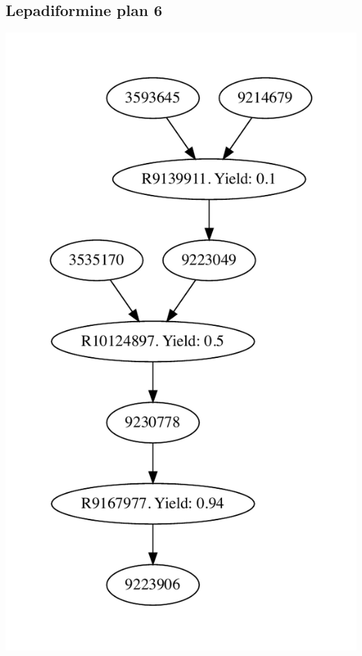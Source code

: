 \documentclass[a4paper,10pt,titlepage]{paper}
\begin{document}
\subsection{Lepadiformine plan 6}
\centering
\includegraphics[scale=0.4]{Synteseplaner/Lepadiformine/plan6.pdf}
\label{Appendix::Lepadiformine6}
\end{document}
